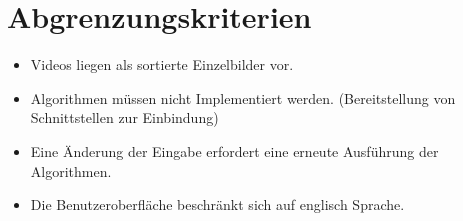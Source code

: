 \section{Abgrenzungskriterien}
\begin{itemize}
	\item Videos liegen als sortierte Einzelbilder vor.
	\item Algorithmen müssen nicht Implementiert werden. (Bereitstellung von Schnittstellen zur Einbindung)
	\item Eine Änderung der Eingabe erfordert eine erneute Ausführung der Algorithmen.
	\item Die Benutzeroberfläche beschränkt sich auf englisch Sprache.
\end{itemize}